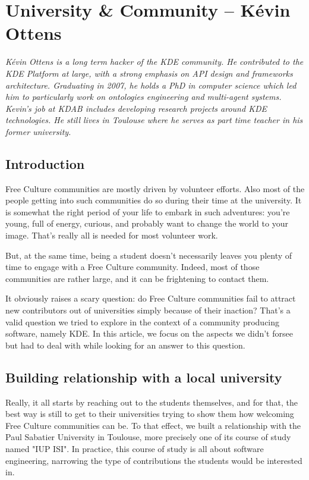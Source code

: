 \section{University \& Community -- Kévin Ottens}

\textit{Kévin Ottens is a long term hacker of the KDE community. He contributed to the KDE Platform at large, with a strong emphasis on API design and frameworks architecture. Graduating in 2007, he holds a PhD in computer science which led him to particularly work on ontologies engineering and multi-agent systems. Kevin's job at KDAB includes developing research projects around KDE technologies. He still lives in Toulouse where he serves as part time teacher in his former university.}

\subsection*{Introduction}
Free Culture communities are mostly driven by volunteer efforts. Also most of the people getting into such communities do so during their time at the university. It is somewhat the right period of your life to embark in such adventures: you're young, full of energy, curious, and probably want to change the world to your image. That's really all is needed for most volunteer work.

But, at the same time, being a student doesn't necessarily leaves you plenty of time to engage with a Free Culture community. Indeed, most of those communities are rather large, and it can be frightening to contact them.

It obviously raises a scary question: do Free Culture communities fail to attract new contributors out of universities simply because of their inaction? That's a valid question we tried to explore in the context of a community producing software, namely KDE. In this article, we focus on the aspects we didn't forsee but had to deal with while looking for an answer to this question.

\subsection*{Building relationship with a local university}
Really, it all starts by reaching out to the students themselves, and for that, the best way is still to get to their universities trying to show them how welcoming Free Culture communities can be. To that effect, we built a relationship with the Paul Sabatier University in Toulouse, more precisely one of its course of study named "IUP ISI". In practice, this course of study is all about software engineering, narrowing the type of contributions the students would be interested in.

